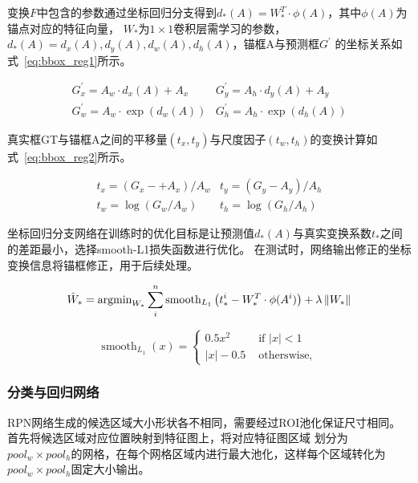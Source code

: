 变换$F$中包含的参数通过坐标回归分支得到$d_{*}(A)=W_{*}^{T} \cdot \phi(A)$，其中$\phi(A)$为锚点对应的特征向量，
$W_{*}$为$1\times1$卷积层需学习的参数，$d_{*}(A)=d_{x}(A), d_{y}(A), d_{w}(A), d_{h}(A)$，锚框A与预测框$G^{\prime}$
的坐标关系如式~\ref{eq:bbox_reg1}所示。

\begin{equation}
  \begin{array}{cc}
    G_{x}^{\prime} =A_{w} \cdot d_{x}(A)+A_{x} & G_{y}^{\prime} = A_{h} \cdot d_{y}(A)+A_{y} \\
    G_{w}^{\prime} =A_{w} \cdot \exp \left(d_{w}(A)\right) & G_{h}^{\prime} =A_{h} \cdot \exp \left(d_{h}(A)\right)
  \end{array}
  \label{eq:bbox_reg1}
\end{equation}

真实框GT与锚框A之间的平移量$(t_{x}, t_{y})$与尺度因子$(t_{w}, t_{h})$的变换计算如式~\ref{eq:bbox_reg2}所示。

\begin{equation}
  \begin{array}{cc}
    t_{x}=\left(G_{x}-+A_{x}\right) / A_{w} & t_{y}=\left(G_{y}-A_{y}\right) / A_{h} \\
    t_{w}=\log \left(G_{w} / A_{w}\right) & t_{h}=\log \left(G_{h} / A_{h}\right)
  \end{array}
  \label{eq:bbox_reg2}
\end{equation}

坐标回归分支网络在训练时的优化目标是让预测值$d_{*}(A)$与真实变换系数$t_{*}$之间的差距最小，选择smooth-L1损失函数进行优化。
在测试时，网络输出修正的坐标变换信息将锚框修正，用于后续处理。

\begin{equation}
  {\hat W_*} = {{\mathop{\rm argmin}\nolimits} _{{W_*}}}\sum\limits_i^n {{{{\mathop{\rm smooth}\nolimits} }_{{L_1}}}
  \left( {t_*^i - W_*^T \cdot \phi ({A^i})} \right)}  + \lambda \left\| {{W_*}} \right\|
  \label{eq:bbox_reg3}
\end{equation}


\begin{equation}
  \operatorname{smooth}_{L_{1}}(x)
  =\left\{\begin{array}{rr} 0.5 x^{2} & \text { if }|x|<1 \\ |x|-0.5 & \text { otherswise, } \end{array}\right.
  \label{eq:bbox_reg4}
\end{equation}

\subsubsection{分类与回归网络}
RPN网络生成的候选区域大小形状各不相同，需要经过ROI池化保证尺寸相同。首先将候选区域对应位置映射到特征图上，将对应特征图区域
划分为$pool_w \times pool_h$的网格，在每个网格区域内进行最大池化，这样每个区域转化为$pool_w \times pool_h$固定大小输出。

